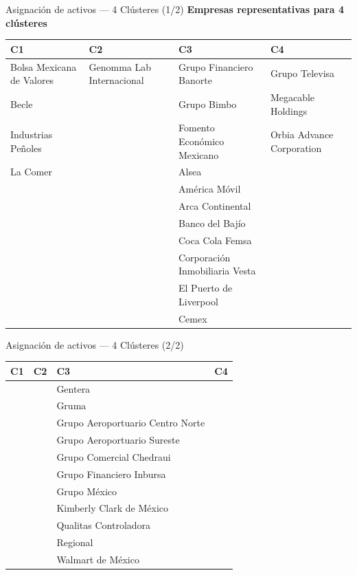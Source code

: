 \documentclass[aspectratio=169,xcolor=dvipsnames]{beamer}
\begin{document}
\begin{frame}{Asignación de activos — 4 Clústeres (1/2)}
    \small
    \textbf{Empresas representativas para 4 clústeres}

    \vspace{0.8em}

    \begin{tabularx}{\textwidth}{@{}X X X X@{}}
        \toprule
        \textbf{C1} & \textbf{C2} & \textbf{C3} & \textbf{C4} \\
        \midrule
        Bolsa Mexicana de Valores & Genomma Lab Internacional & Grupo Financiero Banorte & Grupo Televisa \\
        Becle &  & Grupo Bimbo & Megacable Holdings \\
        Industrias Peñoles &  & Fomento Económico Mexicano  & Orbia Advance Corporation \\
        La Comer & & Alsea & \\
        & & América Móvil & \\
        & & Arca Continental & \\
        & & Banco del Bajío & \\
        & & Coca Cola Femsa & \\
        & & Corporación Inmobiliaria Vesta & \\
        & & El Puerto de Liverpool & \\
        & & Cemex & \\
        \bottomrule
    \end{tabularx}

\end{frame}

\begin{frame}{Asignación de activos — 4 Clústeres (2/2)}
    \small

    \begin{tabularx}{\textwidth}{@{}X X X X@{}}
        \toprule
        \textbf{C1} & \textbf{C2} & \textbf{C3} & \textbf{C4} \\
        \midrule
        & & Gentera & \\
        & & Gruma & \\
        & & Grupo Aeroportuario Centro Norte &  \\
        & & Grupo Aeroportuario Sureste & \\
        & & Grupo Comercial Chedraui &   \\
        & & Grupo Financiero Inbursa & \\
        & & Grupo México &  \\
        & & Kimberly Clark de México &  \\
        & & Qualitas Controladora &  \\
        & & Regional & \\
        & & Walmart de México & \\
        \bottomrule
    \end{tabularx}
\end{frame}
\end{document}
